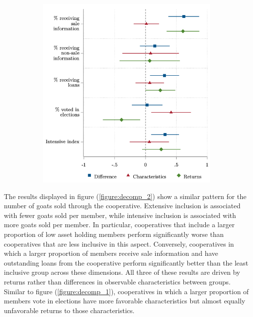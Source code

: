 \documentclass[11pt]{article}
\begin{document}
\begin{figure}[H]
\begin{subfigure}[t]{0.47\textwidth}
        \includegraphics[width=\linewidth,trim=4 4 4 4,clip]{decomp_2_in.png} 
    \end{subfigure}
\end{figure}

The results displayed in figure (\ref{figure:decomp_2}) show a similar pattern for the number of goats sold through the cooperative. Extensive inclusion is associated with fewer goats sold per member, while intensive inclusion is associated with more goats sold per member. In particular, cooperatives that include a larger proportion of low asset holding members perform significantly worse than cooperatives that are less inclusive in this aspect. Conversely, cooperatives in which a larger proportion of members receive sale information and have outstanding loans from the cooperative perform significantly better than the least inclusive group across these dimensions. All three of these results are driven by returns rather than differences in observable characteristics between groups. Similar to figure (\ref{figure:decomp_1}), cooperatives in which a larger proportion of members vote in elections have more favorable characteristics but almost equally unfavorable returns to those characteristics. 
\end{document}
